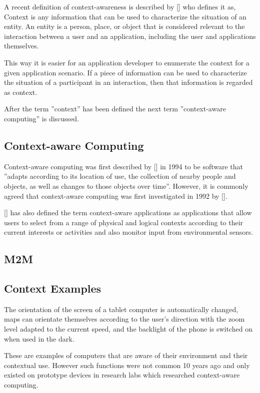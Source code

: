 A recent definition of context-awareness is described by [\citeauthor{Dey2000b}] who defines it as, Context is any information that can be used to characterize the situation of an entity. An entity is a person, place, or object that is considered relevant to the interaction between a user and an application, including the user and applications themselves. 

This way it is easier for an application developer to enumerate the context for a given application scenario. If a piece of information can be used to characterize the situation of a participant in an interaction, then that information is regarded as context.

After the term ''context'' has been defined the next term ''context-aware computing'' is discussed.

\subsection{Context-aware Computing}
Context-aware computing was first described by [\citeauthor{ieee313011}] in 1994 to be software that ''adapts according to its location of use, the collection of nearby people and objects, as well as changes to those objects over time''. However, it is commonly agreed that context-aware computing was first investigated in 1992 by [\citeauthor{WantHFG92}]. 

[\citeauthor{RyanME}] has also defined the term context-aware applications as applications that allow users to select from a range of physical and logical contexts according to their current interests or activities and also monitor input from environmental sensors.

\subsection{M2M}

\subsection{Context Examples}
The orientation of the screen of a tablet computer is automatically changed, maps can orientate themselves according to the user's direction with the zoom level adapted to the current speed, and the backlight of the phone is switched on when used in the dark.

These are examples of computers that are aware of their environment and their contextual use. However such functions were not common 10 years ago and only existed on prototype devices in research labs which researched context-aware computing.
\\

